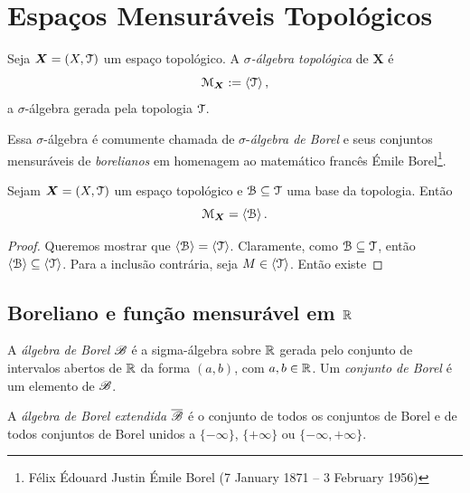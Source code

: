 \clearpage
\section{Espaços Mensuráveis Topológicos}

\begin{defi}
Seja $\bm X=(X,\mathcal{T})$ um espaço topológico. A \emph{$\sigma$-álgebra topológica} de $\bm X$ é
	\begin{equation*}
	\mathcal{M}_{\bm X} := \left\langle \mathcal{T} \right\rangle,
	\end{equation*}
a $\sigma$-álgebra gerada pela topologia $\mathcal{T}$.
\end{defi}

Essa $\sigma$-álgebra é comumente chamada de $\sigma$-\emph{álgebra de Borel} e seus conjuntos mensuráveis de \emph{borelianos} em homenagem ao matemático francês Émile Borel\footnote{Félix Édouard Justin Émile Borel (7 January 1871 – 3 February 1956)}.

\begin{prop}
Sejam $\bm X=(X,\mathcal{T})$ um espaço topológico e $\mathcal{B} \subseteq \mathcal{T}$ uma base da topologia. Então
	\begin{equation*}
	\mathcal{M}_{\bm X} = \left\langle \mathcal B \right\rangle.
	\end{equation*}
\end{prop}
\begin{proof}
Queremos mostrar que $\left\langle \mathcal B \right\rangle = \left\langle \mathcal{T} \right\rangle$. Claramente, como $\mathcal B \subseteq \mathcal{T}$, então $\left\langle \mathcal B \right\rangle \subseteq \left\langle \mathcal{T} \right\rangle$. Para a inclusão contrária, seja $M \in \left\langle \mathcal{T} \right\rangle$. Então existe 
\end{proof}

\subsection{Boreliano e função mensurável em $\mathbb{R}$}

\begin{defi}
	A \emph{álgebra de Borel} $\mathscr{B}$ é a sigma-álgebra sobre $\mathbb{R}$ gerada pelo conjunto de intervalos abertos de $\mathbb{R}$ da forma $(a,b)$, com $a,b \in \mathbb{R}$. Um \emph{conjunto de Borel} é um elemento de $\mathscr{B}$.
\end{defi}

\begin{defi}
	A \emph{álgebra de Borel extendida} $\overline{\mathscr{B}}$ é o conjunto de todos os conjuntos de Borel e de todos conjuntos de Borel unidos a $\{-\infty\}$, $\{+\infty\}$ ou $\{-\infty,+\infty\}$.
\end{defi}

